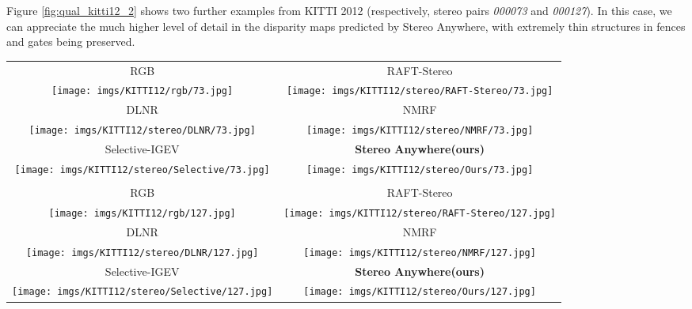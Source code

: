 \documentclass[10pt,twocolumn,letterpaper]{article}
\newcommand{\method}[0]{Stereo Anywhere\xspace}
\begin{document}
\clearpage

Figure \ref{fig:qual_kitti12_2} shows two further examples from KITTI 2012 (respectively, stereo pairs \textit{000073} and \textit{000127}). In this case, we can appreciate the much higher level of detail in the disparity maps predicted by \method, with extremely thin structures in fences and gates being preserved.

\begin{figure*}[h]
    \centering
    \renewcommand{\tabcolsep}{1pt}
    \begin{tabular}{cc}
        \small RGB &
        \small RAFT-Stereo \cite{lipson2021raft} \\
        \texttt{[image: imgs/KITTI12/rgb/73.jpg]} &
        \texttt{[image: imgs/KITTI12/stereo/RAFT-Stereo/73.jpg]} \\
        \small DLNR \cite{zhao2023high} &
        \small NMRF \cite{guan2024neural} \\
        \texttt{[image: imgs/KITTI12/stereo/DLNR/73.jpg]} &
        \texttt{[image: imgs/KITTI12/stereo/NMRF/73.jpg]} \\
        \small Selective-IGEV \cite{wang2024selective} &
        \textbf{\method (ours)} \\
        \texttt{[image: imgs/KITTI12/stereo/Selective/73.jpg]} &
        \texttt{[image: imgs/KITTI12/stereo/Ours/73.jpg]} \\ \\
        \small RGB &
        \small RAFT-Stereo \cite{lipson2021raft} \\
        \texttt{[image: imgs/KITTI12/rgb/127.jpg]} &
        \texttt{[image: imgs/KITTI12/stereo/RAFT-Stereo/127.jpg]} \\
        \small DLNR \cite{zhao2023high} &
        \small NMRF \cite{guan2024neural} \\
        \texttt{[image: imgs/KITTI12/stereo/DLNR/127.jpg]} &
        \texttt{[image: imgs/KITTI12/stereo/NMRF/127.jpg]} \\
        \small Selective-IGEV \cite{wang2024selective} &
        \textbf{\method (ours)} \\
        \texttt{[image: imgs/KITTI12/stereo/Selective/127.jpg]} &
        \texttt{[image: imgs/KITTI12/stereo/Ours/127.jpg]} \\
    \end{tabular}

    \caption{\textbf{Qualitative Results -- KITTI 2012 (part 2).} Predictions by state-of-the-art models and \method.}
    \label{fig:qual_kitti12_2}\vspace{-0.3cm}

\end{figure*}
\end{document}

